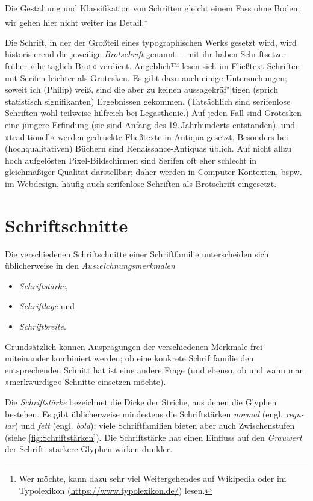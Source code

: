 Die Gestaltung und Klassifikation von Schriften gleicht einem Fass
ohne Boden; wir gehen hier nicht weiter ins Detail.\footnote{Wer
  möchte, kann dazu sehr viel Weitergehendes auf Wikipedia oder im
  Typo\-lexikon (\url{https://www.typolexikon.de/}) lesen.}

Die Schrift, in der der Großteil eines typographischen Werks gesetzt
wird, wird historisierend die jeweilige \emph{Brotschrift} genannt~--
mit ihr haben Schriftsetzer früher »ihr täglich Brot« verdient.
Angeblich™ lesen sich im Fließtext Schriften mit Serifen leichter als
Grotesken.  Es gibt dazu auch einige Untersuchungen; soweit ich
(Philip) weiß, sind die aber zu keinen aussagekräf"|tigen (sprich
statistisch signifikanten) Ergebnissen gekommen.  (Tatsächlich sind
serifenlose Schriften wohl teilweise hilfreich bei Legasthenie.)  Auf
jeden Fall sind Grotesken eine jüngere Erfindung (sie sind Anfang des
19.\,Jahrhunderts entstanden), und »traditionell« werden gedruckte
Fließtexte in Antiqua gesetzt.  Besonders bei (hochqualitativen)
Büchern sind Renaissance-Antiquas üblich.  Auf nicht allzu hoch
aufgelösten Pixel-Bildschirmen sind Serifen oft eher schlecht in
gleichmäßiger Qualität darstellbar; daher werden in
Computer-Kontexten, bspw. im Webdesign, häufig auch serifenlose
Schriften als Brotschrift eingesetzt.

\section{Schriftschnitte}
\label{sec:Schnitte}

Die verschiedenen Schriftschnitte einer Schriftfamilie unterscheiden
sich üblicherweise in den \emph{Auszeichnungsmerkmalen}
\begin{itemize}
\item \emph{Schriftstärke},
\item \emph{Schriftlage} und
\item \emph{Schriftbreite}.
\end{itemize}
Grundsätzlich können Ausprägungen der verschiedenen Merkmale frei
miteinander kombiniert werden; ob eine konkrete Schriftfamilie den
entsprechenden Schnitt hat ist eine andere Frage (und ebenso, ob und
wann man »merkwürdige« Schnitte einsetzen möchte).

Die \emph{Schriftstärke} bezeichnet die Dicke der Striche, aus denen
die Glyphen bestehen.  Es gibt üblicherweise mindestens die
Schriftstärken \emph{normal}
(engl. \emph{\foreignlanguage{british}{regular}}) und \emph{fett}
(engl. \emph{\foreignlanguage{british}{bold}}); viele Schriftfamilien
bieten aber auch Zwischenstufen (siehe \cref{fig:Schriftstärken}).
Die Schriftstärke hat einen Einfluss auf den \emph{Grauwert} der
Schrift: stärkere Glyphen wirken dunkler.

